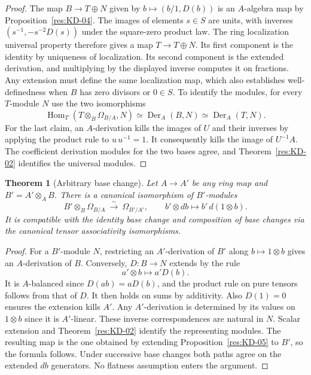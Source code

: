 \documentclass[11pt,oneside,openany]{book}
\newtheorem{theorem}{Theorem}[chapter]
\theoremstyle{definition}
\theoremstyle{remark}
\begin{document}
\begin{proof}
The map $B\to T\oplus N$ given by $b\mapsto(b/1,D(b))$ is an $A$-algebra map by Proposition~\ref{res:KD-04}. The images of elements $s\in S$ are units, with inverses $(s^{-1},-s^{-2}D(s))$ under the square-zero product law. The ring localization universal property therefore gives a map $T\to T\oplus N$. Its first component is the identity by uniqueness of localization. Its second component is the extended derivation, and multiplying by the displayed inverse computes it on fractions. Any extension must define the same localization map, which also establishes well-definedness when $B$ has zero divisors or $0\in S$. To identify the modules, for every $T$-module $N$ use the two isomorphisms
\[
 \operatorname{Hom}_T(T\otimes_B\Omega_{B/A},N)
 \simeq\operatorname{Der}_A(B,N)
 \simeq\operatorname{Der}_A(T,N).
\]
For the last claim, an $A$-derivation kills the images of $U$ and their inverses by applying the product rule to $u\,u^{-1}=1$. It consequently kills the image of $U^{-1}A$. The coefficient derivation modules for the two bases agree, and Theorem~\ref{res:KD-02} identifies the universal modules.
\end{proof}

\begin{theorem}[Arbitrary base change]\label{res:KD-17}
Let $A\to A'$ be any ring map and $B'=A'\otimes_A B$. There is a canonical isomorphism of $B'$-modules
\[
 B'\otimes_B\Omega_{B/A}\ \xrightarrow{\ \sim\ }\ \Omega_{B'/A'},
 \qquad b'\otimes db\longmapsto b'\,d(1\otimes b).
\]
It is compatible with the identity base change and composition of base changes via the canonical tensor associativity isomorphisms.
\end{theorem}

\begin{proof}
For a $B'$-module $N$, restricting an $A'$-derivation of $B'$ along $b\mapsto 1\otimes b$ gives an $A$-derivation of $B$. Conversely, $D:B\to N$ extends by the rule
\[
 a'\otimes b\longmapsto a'D(b).
\]
It is $A$-balanced since $D(ab)=aD(b)$, and the product rule on pure tensors follows from that of $D$. It then holds on sums by additivity. Also $D(1)=0$ ensures the extension kills $A'$. Any $A'$-derivation is determined by its values on $1\otimes b$ since it is $A'$-linear. These inverse correspondences are natural in $N$. Scalar extension and Theorem~\ref{res:KD-02} identify the representing modules. The resulting map is the one obtained by extending Proposition~\ref{res:KD-05} to $B'$, so the formula follows. Under successive base changes both paths agree on the extended $db$ generators. No flatness assumption enters the argument.
\end{proof}
\end{document}

